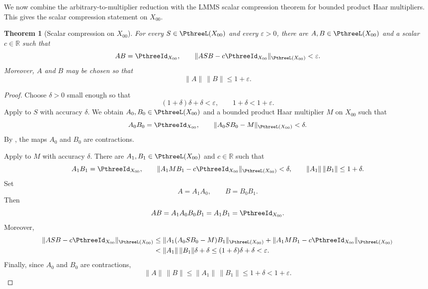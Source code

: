 \documentclass[11pt,reqno]{amsart}
\makeatletter
\theoremstyle{plain}
\newtheorem{theorem}{Theorem}[section]
\theoremstyle{definition}
\newcounter{problempaper}
\newenvironment{problempaperbody}{%
  \setcounter{subsection}{0}%
  \setcounter{subsubsection}{0}%
  \setcounter{paragraph}{0}%
  \renewcommand{\thesubsection}{\arabic{subsection}}%
  \renewcommand{\thesubsubsection}{\thesubsection.\arabic{subsubsection}}%
  \renewcommand{\theparagraph}{\thesubsubsection.\arabic{paragraph}}%
  \let\problem@outersection\section
  \let\problem@outersubsection\subsection
  \let\problem@outersubsubsection\subsubsection
  \let\problem@outerparagraph\paragraph
  \let\section\problem@papersection
  \let\subsection\problem@papersubsection
  \let\subsubsection\problem@papersubsubsection
}{%
  \let\section\problem@outersection
  \let\subsection\problem@outersubsection
  \let\subsubsection\problem@outersubsubsection
  \let\paragraph\problem@outerparagraph
}
\newcommand{\problem@target}[2]{%
  \hypertarget{problem-\theproblempaper-#1-#2}{}%
}
\newcommand{\problem@paperheading}[3]{%
  \par\bigskip
  \problem@target{#1}{#2}%
  \noindent{\large\bfseries #2.\quad #3\par}%
  \nobreak\smallskip
}
\newcommand{\problem@papersubheading}[3]{%
  \par\medskip
  \problem@target{#1}{#2}%
  \noindent{\normalsize\bfseries #2.\quad #3\par}%
  \nobreak\smallskip
}
\newcommand{\problem@papersubsubheading}[3]{%
  \par\smallskip
  \problem@target{#1}{#2}%
  \noindent{\normalsize\itshape #2.\quad #3.\ }%
}
\def\problem@papersection{%
  \@ifstar{\problem@papersectionstar}{\problem@papersectionnostar}%
}
\def\problem@papersectionstar#1{%
  \par\bigskip\noindent{\large\bfseries #1\par}\nobreak\smallskip
}
\def\problem@papersectionnostar#1{%
  \refstepcounter{subsection}%
  \setcounter{subsubsection}{0}%
  \setcounter{paragraph}{0}%
  \problem@paperheading{section}{\thesubsection}{#1}%
  \problem@writecontentsline{section}{\thesubsection}{#1}%
}
\def\problem@papersubsection{%
  \@ifstar{\problem@papersubsectionstar}{\problem@papersubsectionnostar}%
}
\def\problem@papersubsectionstar#1{%
  \par\medskip\noindent{\normalsize\bfseries #1\par}\nobreak\smallskip
}
\def\problem@papersubsectionnostar#1{%
  \refstepcounter{subsubsection}%
  \setcounter{paragraph}{0}%
  \problem@papersubheading{subsection}{\thesubsubsection}{#1}%
  \problem@writecontentsline{subsection}{\thesubsubsection}{#1}%
}
\def\problem@papersubsubsection{%
  \@ifstar{\problem@papersubsubsectionstar}{\problem@papersubsubsectionnostar}%
}
\def\problem@papersubsubsectionstar#1{%
  \par\smallskip\noindent{\normalsize\itshape #1.\ }%
}
\def\problem@papersubsubsectionnostar#1{%
  \refstepcounter{paragraph}%
  \problem@papersubsubheading{subsubsection}{\theparagraph}{#1}%
  \problem@writecontentsline{subsubsection}{\theparagraph}{#1}%
}
\newcommand{\problem@writecontentsline}[3]{%
  \begingroup
  \protected@write\@auxout{}{%
    \string\problemcontentsentry{\theproblempaper}{#1}{#2}{#3}{\thepage}%
  }%
  \endgroup
}
\newcommand{\problemcontentsentry}[5]{%
  \@ifundefined{problemcontents@#1}{%
    \expandafter\gdef\csname problemcontents@#1\endcsname{}%
  }{}%
  \expandafter\g@addto@macro\csname problemcontents@#1\endcsname{%
    \problemcontentsline{#1}{#2}{#3}{#4}{#5}%
  }%
}
\newcommand{\problemcontentslink}[4]{%
  \hyperlink{problem-#1-#2-#3}{#4}%
}
\newcommand{\problemcontentsline}[5]{%
  \ifstrequal{#2}{section}{%
    \par\noindent
    \problemcontentslink{#1}{#2}{#3}{\makebox[2.5em][l]{#3}#4}%
    \nobreak\dotfill
    \problemcontentslink{#1}{#2}{#3}{#5}\par
  }{%
    \ifstrequal{#2}{subsection}{%
      \par\noindent\hspace*{1.5em}%
      \problemcontentslink{#1}{#2}{#3}{\makebox[3.5em][l]{#3}#4}%
      \nobreak\dotfill
      \problemcontentslink{#1}{#2}{#3}{#5}\par
    }{%
      \par\noindent\hspace*{3em}%
      \problemcontentslink{#1}{#2}{#3}{\makebox[4.5em][l]{#3}#4}%
      \nobreak\dotfill
      \problemcontentslink{#1}{#2}{#3}{#5}\par
    }%
  }%
}
\makeatother
\begin{document}
\begin{problempaperbody}
We now combine the arbitrary-to-multiplier reduction with the LMMS scalar compression theorem for bounded product Haar multipliers. This gives the scalar compression statement on $X_{00}$.

\begin{theorem}[Scalar compression on $X_{00}$]
\label{p3:thm:scalar-x00}
For every $S\in\PthreeL(X_{00})$ and every $\varepsilon>0$, there are $A,B\in\PthreeL(X_{00})$ and a scalar $c\in\mathbb R$ such that
\begin{equation*}
        AB=\PthreeId_{X_{00}},\qquad \|ASB-c\PthreeId_{X_{00}}\|_{\PthreeL(X_{00})}<\varepsilon .
\end{equation*}
Moreover, $A$ and $B$ may be chosen so that
\begin{equation*}
        \|A\|\,\|B\|\leq 1+\varepsilon .
\end{equation*}
\end{theorem}



\begin{proof}
Choose $\delta>0$ small enough so that
\begin{equation*}
        (1+\delta)\delta+\delta<\varepsilon,\qquad 1+\delta<1+\varepsilon .
\end{equation*}
Apply  to $S$ with accuracy $\delta$. We obtain $A_0,B_0\in\PthreeL(X_{00})$ and a bounded product Haar multiplier $M$ on $X_{00}$ such that
\begin{equation*}
        A_0B_0=\PthreeId_{X_{00}},\qquad \|A_0SB_0-M\|_{\PthreeL(X_{00})}<\delta .
\end{equation*}
By , the maps $A_0$ and $B_0$ are contractions.

Apply  to $M$ with accuracy $\delta$. There are $A_1,B_1\in\PthreeL(X_{00})$ and $c\in\mathbb R$ such that
\begin{equation*}
        A_1B_1=\PthreeId_{X_{00}},\qquad \|A_1MB_1-c\PthreeId_{X_{00}}\|_{\PthreeL(X_{00})}<\delta,\qquad \|A_1\|\,\|B_1\|\leq 1+\delta .
\end{equation*}
Set
\begin{equation*}
        A=A_1A_0,\qquad B=B_0B_1 .
\end{equation*}
Then
\begin{equation*}
        AB=A_1A_0B_0B_1=A_1B_1=\PthreeId_{X_{00}}.
\end{equation*}
Moreover,
\begin{equation*}
\begin{aligned}
        \|ASB-c\PthreeId_{X_{00}}\|_{\PthreeL(X_{00})}
        &\leq \|A_1(A_0SB_0-M)B_1\|_{\PthreeL(X_{00})}+\|A_1MB_1-c\PthreeId_{X_{00}}\|_{\PthreeL(X_{00})} \\
        &< \|A_1\|\,\|B_1\|\delta+\delta \leq (1+\delta)\delta+\delta<\varepsilon .
\end{aligned}
\end{equation*}
Finally, since $A_0$ and $B_0$ are contractions,
\begin{equation*}
        \|A\|\,\|B\|\leq \|A_1\|\,\|B_1\|\leq 1+\delta<1+\varepsilon.
\end{equation*}
\end{proof}


\end{problempaperbody}
\end{document}
